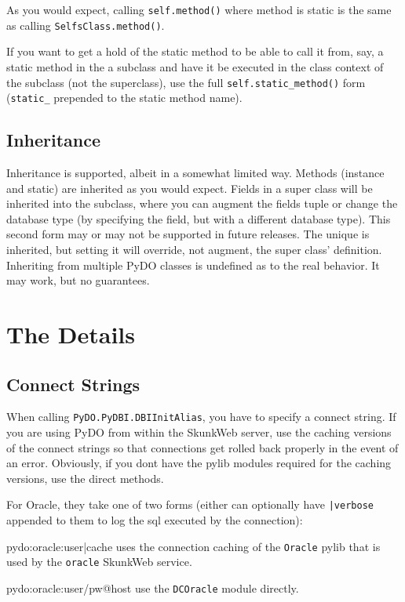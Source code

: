 \documentclass[titlepage]{manual}
\begin{document}
As you would expect, calling \texttt{self.method()} where method is
static is the same as calling \texttt{SelfsClass.method()}.

If you want to get a hold of the static method to be able to call it
from, say, a static method in the a subclass and have it be executed
in the class context of the subclass (not the superclass), use the
full \texttt{self.static_method()} form (\texttt{static_} prepended to
the static method name).

\section{Inheritance}
Inheritance is supported, albeit in a somewhat limited way.  Methods
(instance and static) are inherited as you would expect.  Fields in a
super class will be inherited into the subclass, where you can augment
the fields tuple or change the database type (by specifying the field,
but with a different database type).  This second form may or may not
be supported in future releases.  The unique is inherited, but setting
it will override, not augment, the super class' definition.
Inheriting from multiple PyDO classes is undefined as to the real
behavior.  It may work, but no guarantees.


\chapter{The Details}
\section{Connect Strings}
When calling \texttt{PyDO.PyDBI.DBIInitAlias}, you have to specify a connect
string.  If you are using PyDO from within the SkunkWeb server, use
the caching versions of the connect strings so that connections get
rolled back properly in the event of an error.  Obviously, if you 
dont have the pylib modules required for the caching versions, use
the direct methods.

For Oracle, they take one of two forms (either can optionally have
\texttt{|verbose} appended to them to log the sql executed by the
connection):
\begin{argdesc} 
\item[pydo:oracle:user|cache] uses the connection caching of the
\texttt{Oracle} pylib that is used by the \texttt{oracle} SkunkWeb
service.
\item[pydo:oracle:user/pw@host] use the \texttt{DCOracle} module
directly.
\end{argdesc}
\end{document}
